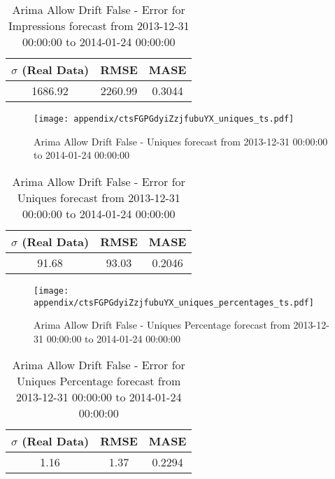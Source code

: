 \begin{table}[H]
\centering
\footnotesize
\begin{tabular}{ccc}
$\sigma$ (Real Data) & RMSE & MASE   \\ \hline
1686.92 & 2260.99 & 0.3044 \\
\end{tabular}

\vspace{0.5cm}

\caption{
Arima Allow Drift False - Error for Impressions forecast from 2013-12-31 00:00:00 to 2014-01-24 00:00:00}
\end{table}

\begin{figure}[H] \begin{center} \leavevmode
\texttt{[image: appendix/ctsFGPGdyiZzjfubuYX\_uniques\_ts.pdf]} \caption{
Arima Allow Drift False - Uniques forecast from 2013-12-31 00:00:00 to 2014-01-24 00:00:00} \label{fig:appendix/ctsFGPGdyiZzjfubuYX_uniques_ts.pdf} \end{center}
\end{figure}

\begin{table}[H]
\centering
\footnotesize
\begin{tabular}{ccc}
$\sigma$ (Real Data) & RMSE & MASE   \\ \hline
91.68 & 93.03 & 0.2046 \\
\end{tabular}

\vspace{0.5cm}

\caption{
Arima Allow Drift False - Error for Uniques forecast from 2013-12-31 00:00:00 to 2014-01-24 00:00:00}
\end{table}

\begin{figure}[H] \begin{center} \leavevmode
\texttt{[image: appendix/ctsFGPGdyiZzjfubuYX\_uniques\_percentages\_ts.pdf]} \caption{
Arima Allow Drift False - Uniques Percentage forecast from 2013-12-31 00:00:00 to 2014-01-24 00:00:00} \label{fig:appendix/ctsFGPGdyiZzjfubuYX_uniques_percentages_ts.pdf} \end{center}
\end{figure}

\begin{table}[H]
\centering
\footnotesize
\begin{tabular}{ccc}
$\sigma$ (Real Data) & RMSE & MASE   \\ \hline
1.16 & 1.37 & 0.2294 \\
\end{tabular}

\vspace{0.5cm}

\caption{
Arima Allow Drift False - Error for Uniques Percentage forecast from 2013-12-31 00:00:00 to 2014-01-24 00:00:00}
\end{table}

